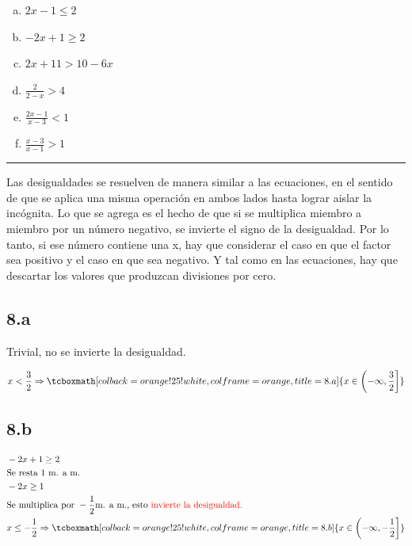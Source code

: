 \documentclass{article}
\newcommand{\hresult}[2]{\tcboxmath[colback=orange!25!white,colframe=orange, title=#1] {#2} }
\begin{document}
\begin{enumerate}[(a)]
\bfseries

\item $ 2x-1 \leq 2 $

\item $ -2x+1 \geq 2 $

\item $ 2x + 11 > 10-6x $

\item $ \frac{2}{2-x} > 4 $

\item $ \frac{2x-1}{x-3} < 1 $

\item $ \frac{x-3}{x-1} > 1 $

\end{enumerate}
\hrule
\vspace{1em}
Las desigualdades se resuelven de manera similar a las ecuaciones, en el sentido de que se aplica una misma operación en ambos lados hasta lograr aislar la incógnita. Lo que se agrega es el hecho de que si se multiplica miembro a miembro por un número negativo, se invierte el signo de la desigualdad. Por lo tanto, si ese número contiene una x, hay que considerar el caso en que el factor sea positivo y el caso en que sea negativo. Y tal como en las ecuaciones, hay que descartar los valores que produzcan divisiones por cero.

\subsection*{8.a}
\label{subsec:8.a}

Trivial, no se invierte la desigualdad.

\begin{equation}
x < \frac{3}{2} \Rightarrow \hresult{8.a} { x \in \left(-\infty, \frac{3}{2}\right] }
\end{equation}

\subsection*{8.b}
\label{subsec:8.b}

\begin{subequations}
\begin{align}
& -2x+1 \geq 2 \\
& \text{Se resta 1 m. a m.} \\
& -2x \geq 1 \\
& \text{Se multiplica por } -\frac{1}{2} \text{m. a m., esto \color{red}{invierte} la desigualdad.} \\
& x \leq -\frac{1}{2} \Rightarrow \hresult{8.b} { x \in \left( -\infty, -\frac{1}{2} \right] }
\end{align}
\end{subequations}
\end{document}
